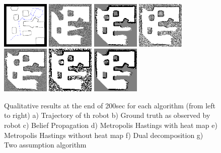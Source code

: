 \documentclass[letterpaper, 10 pt, conference]{ieeeconf} %
\begin{document}
\begin{figure}
  \includegraphics[width=0.2\textwidth]{../figures/cave_trajectory.png}%
  \includegraphics[width=0.2\textwidth]{../figures/gt-final.png}%
  \includegraphics[width=0.2\textwidth]{../figures/bpresults_100x100_200sec.png}%
  \includegraphics[width=0.2\textwidth]{../figures/SICKDDMCMC200sec_100x100.png}\\
  \includegraphics[width=0.2\textwidth]{../figures/SICKSlowMetropolis200sec_100x100.png}%
  \includegraphics[width=0.2\textwidth]{../figures/dualdecomposition200sec_100x100.png}%
  \includegraphics[width=0.2\textwidth]{../figures/TwoAssumptionAlgo200sec_100x100.png}%
  \caption{Qualitative results at the end of 200sec for each algorithm (from left to right) a) Trajectory of th robot b) Ground truth as observed by robot c) Belief Propagation d) Metropolis Hastings with heat map e) Metropolis Hastings without heat map f) Dual decomposition g) Two assumption algorithm}
  \label{fig:convergence-comparison-visuals}
\end{figure}
\end{document}

